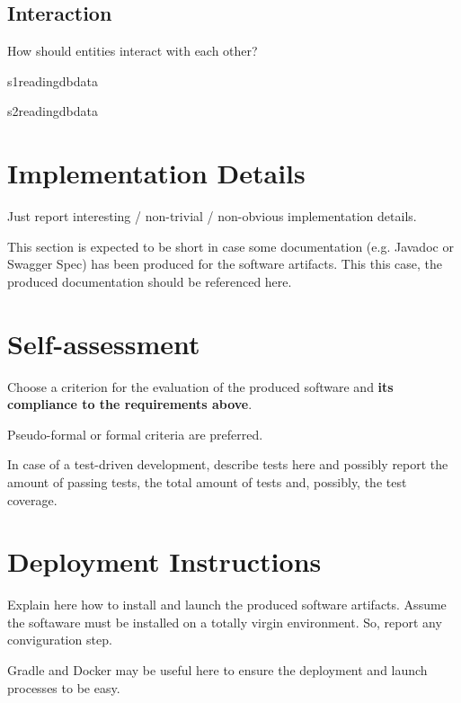 \documentclass[12pt,a4paper,oneside,article]{article}
\begin{document}
		\subsection{Interaction}
			How should entities interact with each other?
			
			\begin{sequencediagram}
				\begin{call}{s1}{reading}{db}{data}
					\postlevel
				\end{call}
				\prelevel\prelevel
				\begin{call}{s2}{reading}{db}{data}
					\postlevel
				\end{call}
			\end{sequencediagram}
			
	\section{Implementation Details}
		Just report interesting / non-trivial / non-obvious implementation details.
		
		This section is expected to be short in case some documentation (e.g. Javadoc or Swagger Spec) has been produced for the software artifacts. This this case, the produced documentation should be referenced here.
		
	\section{Self-assessment}
		Choose a criterion for the evaluation of the produced software and \textbf{its compliance to the requirements above}.
		
		Pseudo-formal or formal criteria are preferred.
		
		In case of a test-driven development, describe tests here and possibly report the amount of passing tests, the total amount of tests and, possibly, the test coverage.
		
	\section{Deployment Instructions}
		Explain here how to install and launch the produced software artifacts. Assume the softaware must be installed on a totally virgin environment. So, report any conviguration step.
		
		Gradle and Docker may be useful here to ensure the deployment and launch processes to be easy.
		
\end{document}
